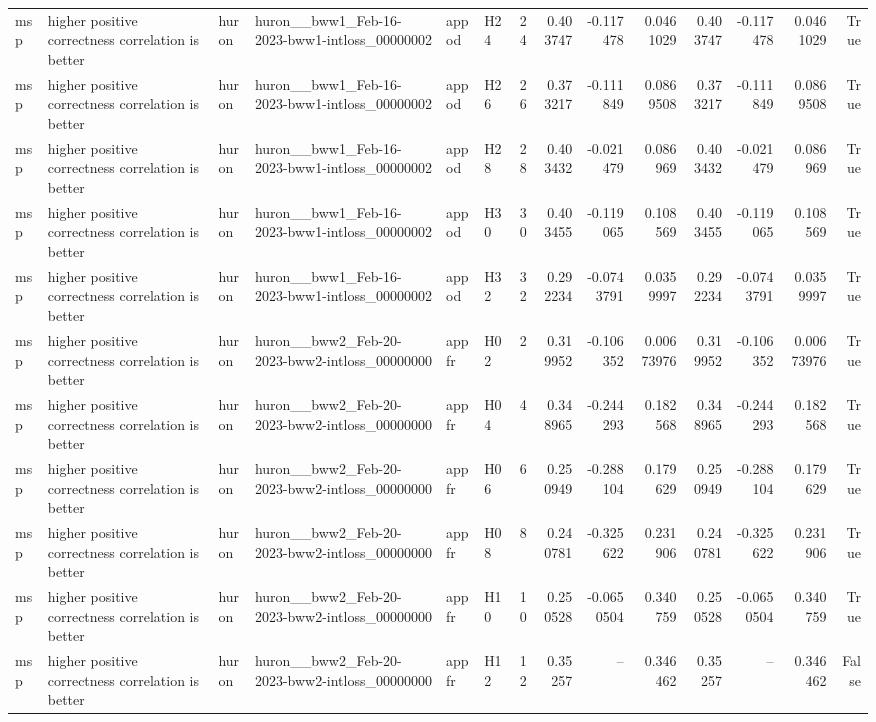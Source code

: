 \begin{longtable}{llllllrrrrrrrr}
msp & higher positive correctness correlation is better & huron & huron\_\_bww1\_Feb-16-2023-bww1-intloss\_00000002 & appod & H24 & 24 & 0.403747 & -0.117478 & 0.0461029 & 0.403747 & -0.117478 & 0.0461029 & True \\
msp & higher positive correctness correlation is better & huron & huron\_\_bww1\_Feb-16-2023-bww1-intloss\_00000002 & appod & H26 & 26 & 0.373217 & -0.111849 & 0.0869508 & 0.373217 & -0.111849 & 0.0869508 & True \\
msp & higher positive correctness correlation is better & huron & huron\_\_bww1\_Feb-16-2023-bww1-intloss\_00000002 & appod & H28 & 28 & 0.403432 & -0.021479 & 0.086969 & 0.403432 & -0.021479 & 0.086969 & True \\
msp & higher positive correctness correlation is better & huron & huron\_\_bww1\_Feb-16-2023-bww1-intloss\_00000002 & appod & H30 & 30 & 0.403455 & -0.119065 & 0.108569 & 0.403455 & -0.119065 & 0.108569 & True \\
msp & higher positive correctness correlation is better & huron & huron\_\_bww1\_Feb-16-2023-bww1-intloss\_00000002 & appod & H32 & 32 & 0.292234 & -0.0743791 & 0.0359997 & 0.292234 & -0.0743791 & 0.0359997 & True \\
msp & higher positive correctness correlation is better & huron & huron\_\_bww2\_Feb-20-2023-bww2-intloss\_00000000 & appfr & H02 & 2 & 0.319952 & -0.106352 & 0.00673976 & 0.319952 & -0.106352 & 0.00673976 & True \\
msp & higher positive correctness correlation is better & huron & huron\_\_bww2\_Feb-20-2023-bww2-intloss\_00000000 & appfr & H04 & 4 & 0.348965 & -0.244293 & 0.182568 & 0.348965 & -0.244293 & 0.182568 & True \\
msp & higher positive correctness correlation is better & huron & huron\_\_bww2\_Feb-20-2023-bww2-intloss\_00000000 & appfr & H06 & 6 & 0.250949 & -0.288104 & 0.179629 & 0.250949 & -0.288104 & 0.179629 & True \\
msp & higher positive correctness correlation is better & huron & huron\_\_bww2\_Feb-20-2023-bww2-intloss\_00000000 & appfr & H08 & 8 & 0.240781 & -0.325622 & 0.231906 & 0.240781 & -0.325622 & 0.231906 & True \\
msp & higher positive correctness correlation is better & huron & huron\_\_bww2\_Feb-20-2023-bww2-intloss\_00000000 & appfr & H10 & 10 & 0.250528 & -0.0650504 & 0.340759 & 0.250528 & -0.0650504 & 0.340759 & True \\
msp & higher positive correctness correlation is better & huron & huron\_\_bww2\_Feb-20-2023-bww2-intloss\_00000000 & appfr & H12 & 12 & 0.35257 & -- & 0.346462 & 0.35257 & -- & 0.346462 & False \\

\end{longtable}
